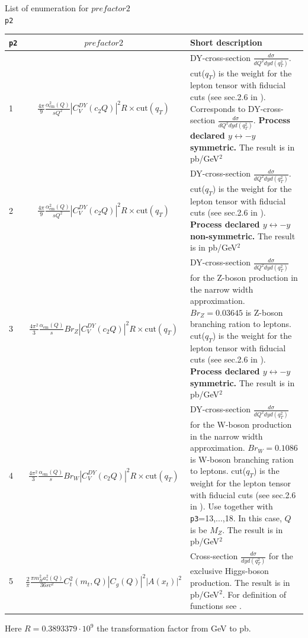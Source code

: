 \documentclass[prd,nofootinbib,eqsecnum,final]{revtex4}
\renewcommand{\(}{\left(}
\renewcommand{\)}{\right)}
\renewcommand{\[}{\left[}
\renewcommand{\]}{\right]}
\begin{document}
\begin{center}
List of enumeration for $prefactor2$
\\
\texttt{p2}
\\
\begin{tabular}{||l|c||p{12cm}||}
\hline\hline
\texttt{p2} & ~~$prefactor2$~~&  Short description 
\\\hline
1 & $\frac{4\pi}{9}\frac{\alpha_{\text{em}}^2(Q)}{sQ^2}|C_V^{DY}(c_2Q)|^2 R \times \text{cut}(q_T)$ & DY-cross-section $\frac{d\sigma}{dQ^2 dy d(q_T^2)}$. cut($q_T$) is the weight for the lepton tensor with fiducial cuts (see sec.2.6 in \cite{Scimemi:2017etj}). Corresponds to DY-cross-section $\frac{d\sigma}{dQ^2 dy d(q_T^2)}$. \textbf{Process declared $y\leftrightarrow -y$ symmetric.}  The result is in pb/GeV$^2$
\\\hline
2 & $\frac{4\pi}{9}\frac{\alpha_{\text{em}}^2(Q)}{sQ^2}|C_V^{DY}(c_2Q)|^2 R \times \text{cut}(q_T)$ & DY-cross-section $\frac{d\sigma}{dQ^2 dy d(q_T^2)}$. cut($q_T$) is the weight for the lepton tensor with fiducial cuts (see sec.2.6 in \cite{Scimemi:2017etj}). \textbf{Process declared $y\leftrightarrow -y$ non-symmetric.}  The result is in pb/GeV$^2$
\\\hline
3 & $\frac{4\pi^2}{3}\frac{\alpha_{\text{em}}(Q)}{s}Br_Z|C_V^{DY}(c_2Q)|^2 R \times \text{cut}(q_T)$ & DY-cross-section $\frac{d\sigma}{dQ^2 dy d(q_T^2)}$ for the Z-boson production in the narrow width approximation. $Br_Z=0.03645$ is Z-boson branching ration to leptons. cut($q_T$) is the weight for the lepton tensor with fiducial cuts (see sec.2.6 in \cite{Scimemi:2017etj}). \textbf{Process declared $y\leftrightarrow -y$ symmetric.}  The result is in pb/GeV$^2$
\\\hline
4 & $\frac{4\pi^2}{3}\frac{\alpha_{\text{em}}(Q)}{s}Br_W|C_V^{DY}(c_2Q)|^2 R \times \text{cut}(q_T)$ & DY-cross-section $\frac{d\sigma}{dQ^2 dy d(q_T^2)}$ for the W-boson production in the narrow width approximation. $Br_W=0.1086$ is W-boson branching ration to leptons. cut($q_T$) is the weight for the lepton tensor with fiducial cuts (see sec.2.6 in \cite{Scimemi:2017etj}). Use together with \texttt{p3}=13,...,18. In this case, $Q$ is be $M_Z$. The result is in pb/GeV$^2$
\\\hline
5 & $\frac{2}{\pi}\frac{\pi m_H^2 a_s^2(Q)}{36 s v^2}C_t^2(m_t,Q)|C_g(Q)|^2|A(x_t)|^2$ & Cross-section $\frac{d\sigma}{dy d(q_T^2)}$ for the exclusive Higgs-boson production. The result is in pb/GeV$^2$. For definition of functions see \cite{Ahrens:2009cxz}.
\\\hline\hline
\end{tabular}
Here $R=0.3893379\cdot 10^9$ the transformation factor from GeV to pb.
\end{center}
\end{document}
